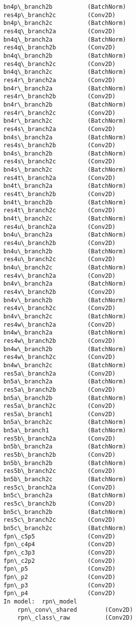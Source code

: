\documentclass[11pt]{article}
\begin{document}
\begin{Verbatim}[commandchars=\\\{\}]
bn4p\_branch2b          (BatchNorm)
res4p\_branch2c         (Conv2D)
bn4p\_branch2c          (BatchNorm)
res4q\_branch2a         (Conv2D)
bn4q\_branch2a          (BatchNorm)
res4q\_branch2b         (Conv2D)
bn4q\_branch2b          (BatchNorm)
res4q\_branch2c         (Conv2D)
bn4q\_branch2c          (BatchNorm)
res4r\_branch2a         (Conv2D)
bn4r\_branch2a          (BatchNorm)
res4r\_branch2b         (Conv2D)
bn4r\_branch2b          (BatchNorm)
res4r\_branch2c         (Conv2D)
bn4r\_branch2c          (BatchNorm)
res4s\_branch2a         (Conv2D)
bn4s\_branch2a          (BatchNorm)
res4s\_branch2b         (Conv2D)
bn4s\_branch2b          (BatchNorm)
res4s\_branch2c         (Conv2D)
bn4s\_branch2c          (BatchNorm)
res4t\_branch2a         (Conv2D)
bn4t\_branch2a          (BatchNorm)
res4t\_branch2b         (Conv2D)
bn4t\_branch2b          (BatchNorm)
res4t\_branch2c         (Conv2D)
bn4t\_branch2c          (BatchNorm)
res4u\_branch2a         (Conv2D)
bn4u\_branch2a          (BatchNorm)
res4u\_branch2b         (Conv2D)
bn4u\_branch2b          (BatchNorm)
res4u\_branch2c         (Conv2D)
bn4u\_branch2c          (BatchNorm)
res4v\_branch2a         (Conv2D)
bn4v\_branch2a          (BatchNorm)
res4v\_branch2b         (Conv2D)
bn4v\_branch2b          (BatchNorm)
res4v\_branch2c         (Conv2D)
bn4v\_branch2c          (BatchNorm)
res4w\_branch2a         (Conv2D)
bn4w\_branch2a          (BatchNorm)
res4w\_branch2b         (Conv2D)
bn4w\_branch2b          (BatchNorm)
res4w\_branch2c         (Conv2D)
bn4w\_branch2c          (BatchNorm)
res5a\_branch2a         (Conv2D)
bn5a\_branch2a          (BatchNorm)
res5a\_branch2b         (Conv2D)
bn5a\_branch2b          (BatchNorm)
res5a\_branch2c         (Conv2D)
res5a\_branch1          (Conv2D)
bn5a\_branch2c          (BatchNorm)
bn5a\_branch1           (BatchNorm)
res5b\_branch2a         (Conv2D)
bn5b\_branch2a          (BatchNorm)
res5b\_branch2b         (Conv2D)
bn5b\_branch2b          (BatchNorm)
res5b\_branch2c         (Conv2D)
bn5b\_branch2c          (BatchNorm)
res5c\_branch2a         (Conv2D)
bn5c\_branch2a          (BatchNorm)
res5c\_branch2b         (Conv2D)
bn5c\_branch2b          (BatchNorm)
res5c\_branch2c         (Conv2D)
bn5c\_branch2c          (BatchNorm)
fpn\_c5p5               (Conv2D)
fpn\_c4p4               (Conv2D)
fpn\_c3p3               (Conv2D)
fpn\_c2p2               (Conv2D)
fpn\_p5                 (Conv2D)
fpn\_p2                 (Conv2D)
fpn\_p3                 (Conv2D)
fpn\_p4                 (Conv2D)
In model:  rpn\_model
    rpn\_conv\_shared        (Conv2D)
    rpn\_class\_raw          (Conv2D)

\end{Verbatim}
\end{document}
